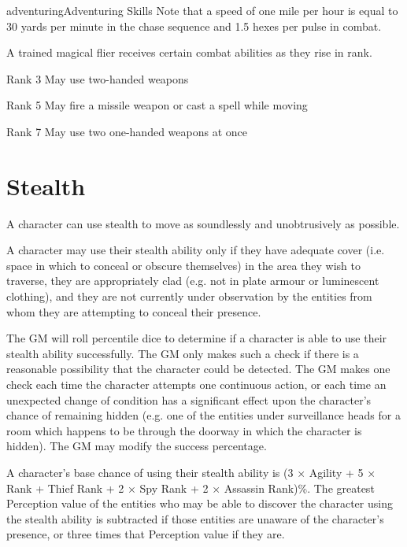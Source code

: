 \begin{Skill}[1.2]{adventuring}{Adventuring Skills}
Note that a speed of one mile per hour is equal to 30 yards per minute
in the chase sequence and 1.5 hexes per pulse in combat.

A trained magical flier receives certain combat abilities as they rise
in rank.

\begin{Description}

\item[Rank 3]  May use two-handed weapons 

\item [Rank 5] May fire a missile weapon or cast a spell while moving

\item[Rank 7] May use two one-handed weapons at once

\end{Description}

\section{Stealth}

A character can use stealth to move as soundlessly and unobtrusively
as possible.

A character may use their stealth ability only if they have adequate
cover (i.e. space in which to conceal or obscure themselves) in the
area they wish to traverse, they are appropriately clad (e.g.  not in
plate armour or luminescent clothing), and they are not currently
under observation by the entities from whom they are attempting to
conceal their presence.

The GM will roll percentile dice to determine if a character is able
to use their stealth ability successfully.  The GM only makes such a
check if there is a reasonable possibility that the character could be
detected.  The GM makes one check each time the character attempts one
continuous action, or each time an unexpected change of condition has
a significant effect upon the character’s chance of remaining hidden
(e.g.  one of the entities under surveillance heads for a room which
happens to be through the doorway in which the character is
hidden). The GM may modify the success percentage.

A character’s base chance of using their stealth ability is (3 ×
Agility + 5 × Rank + Thief Rank + 2 × Spy Rank + 2 × Assassin Rank)\%.
The greatest Perception value of the entities who may be able to
discover the character using the stealth ability is subtracted if
those entities are unaware of the character’s presence, or three
times that Perception value if they are.


\end{Skill}
